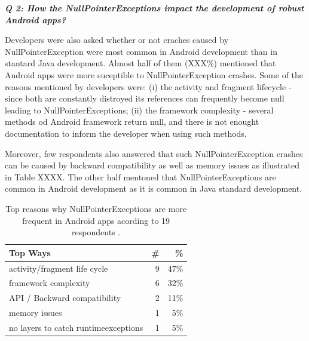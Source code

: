 \bigskip


\noindent\emph{\textbf{Q 2: How the NullPointerExceptions impact the development of robust Android apps?}}

\bigskip 

Developers were also asked whether or not craches caused by NullPointerException were most common in Android development than in stantard Java development.  Almost half of them (XXX\%) mentioned that Android apps were more suceptible to NullPointerException crashes. Some of the reasons mentioned by developers were: (i) the activity and fragment lifecycle - since both are constantly distroyed its references can frequently become null leading to NullPointerExceptions; (ii) the framework complexity - several methods od Android framework return null, and there is not enought documentation to inform the developer when using such methods. 




Moreover, few respondents also answered that such NullPointerException crashes can be caused by backward compatibility as well as memory issues as illustrated in Table XXXX. The other half mentoned that NullPointerExceptions are  common in Android development as it is common in Java standard development.		
	



\begin{table}
\scriptsize
\centering
\begin{tabular}{lrr}
\hline
\bfseries{Top Ways} & \bfseries{\#} & \bfseries{\%} \\
\hline
activity/fragment life cycle  &	9 &	47\% \\
framework complexity	& 6 &	32\% \\
API / Backward compatibility	& 2 &	11\% \\
memory issues & 	1 &	5\% \\
no layers to catch runtimeexceptions	& 1 &	5\% \\
\hline
\end{tabular}
\caption{Top reasons why NullPointerExceptions are more frequent in Android apps acording to 19 respondents . }
\label{tab:handlingruntime}
\end{table}

